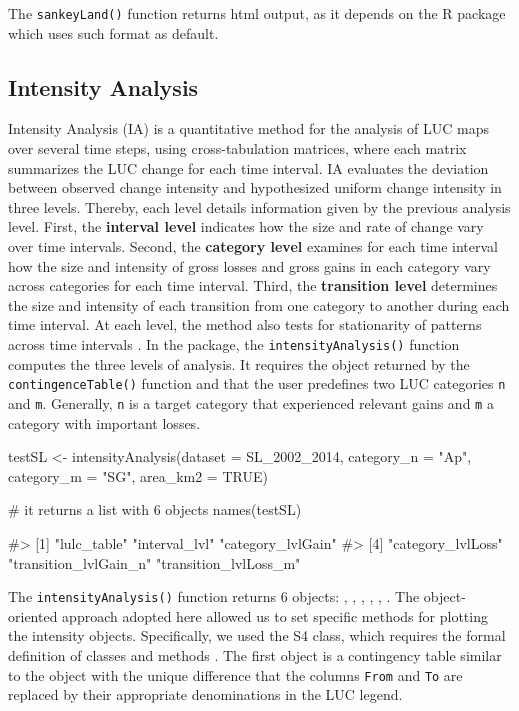 The \texttt{sankeyLand()} function returns html output, as it depends on the  R package which uses such format as default.

\hypertarget{intensity-analysis}{%
\subsection{Intensity Analysis}\label{intensity-analysis}}

Intensity Analysis (IA) is a quantitative method for the analysis of LUC
maps over several time steps, using cross-tabulation matrices, where
each matrix summarizes the LUC change for each time interval. IA
evaluates the deviation between observed change intensity and
hypothesized uniform change intensity in three levels. Thereby, each
level details information given by the previous analysis level. First,
the \textbf{interval level} indicates how the size and rate of change
vary over time intervals. Second, the \textbf{category level} examines
for each time interval how the size and intensity of gross losses and
gross gains in each category vary across categories for each time
interval. Third, the \textbf{transition level} determines the size and
intensity of each transition from one category to another during each
time interval. At each level, the method also tests for stationarity of
patterns across time intervals \citep{Aldwaik2012}. In the 
package, the \texttt{intensityAnalysis()} function computes the three
levels of analysis. It requires the object returned by the
\texttt{contingenceTable()} function and that the user predefines two
LUC categories \texttt{n} and \texttt{m}. Generally, \texttt{n} is a
target category that experienced relevant gains and \texttt{m} a
category with important losses.

\begin{Schunk}
\begin{Sinput}
testSL <- intensityAnalysis(dataset = SL_2002_2014, category_n = "Ap",
                            category_m = "SG", area_km2 = TRUE)

# it returns a list with 6 objects
names(testSL)
\end{Sinput}
\begin{Soutput}
#> [1] "lulc_table"           "interval_lvl"         "category_lvlGain"    
#> [4] "category_lvlLoss"     "transition_lvlGain_n" "transition_lvlLoss_m"
\end{Soutput}
\end{Schunk}

The \texttt{intensityAnalysis()} function returns 6 objects:
, , , ,
, . The object-oriented
approach adopted here allowed us to set specific methods for plotting
the intensity objects. Specifically, we used the S4 class, which
requires the formal definition of classes and methods
\citep{Chambers2008}. The first object is a contingency table similar to
the  object with the unique difference that the columns
\texttt{From} and \texttt{To} are replaced by their appropriate
denominations in the LUC legend.

